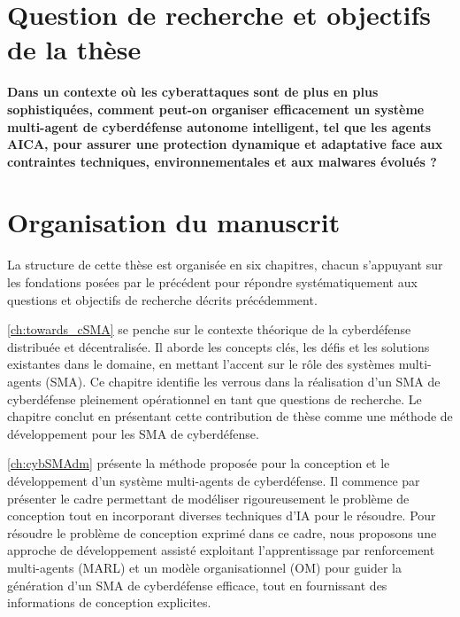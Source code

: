 \section{Question de recherche et objectifs de la thèse}

\textbf{Dans un contexte où les cyberattaques sont de plus en plus sophistiquées, comment peut-on organiser efficacement un système multi-agent de cyberdéfense autonome intelligent, tel que les agents AICA, pour assurer une protection dynamique et adaptative face aux contraintes techniques, environnementales et aux malwares évolués ?}

\section{Organisation du manuscrit}

La structure de cette thèse est organisée en six chapitres, chacun s'appuyant sur les fondations posées par le précédent pour répondre systématiquement aux questions et objectifs de recherche décrits précédemment.


\autoref{ch:towards_cSMA} se penche sur le contexte théorique de la cyberdéfense distribuée et décentralisée. Il aborde les concepts clés, les défis et les solutions existantes dans le domaine, en mettant l'accent sur le rôle des systèmes multi-agents (SMA). Ce chapitre identifie les verrous dans la réalisation d'un SMA de cyberdéfense pleinement opérationnel en tant que questions de recherche. Le chapitre conclut en présentant cette contribution de thèse comme une méthode de développement pour les SMA de cyberdéfense.

\autoref{ch:cybSMAdm} présente la méthode proposée pour la conception et le développement d'un système multi-agents de cyberdéfense. Il commence par présenter le cadre permettant de modéliser rigoureusement le problème de conception tout en incorporant diverses techniques d'IA pour le résoudre. Pour résoudre le problème de conception exprimé dans ce cadre, nous proposons une approche de développement assisté exploitant l'apprentissage par renforcement multi-agents (MARL) et un modèle organisationnel (OM) pour guider la génération d'un SMA de cyberdéfense efficace, tout en fournissant des informations de conception explicites.

